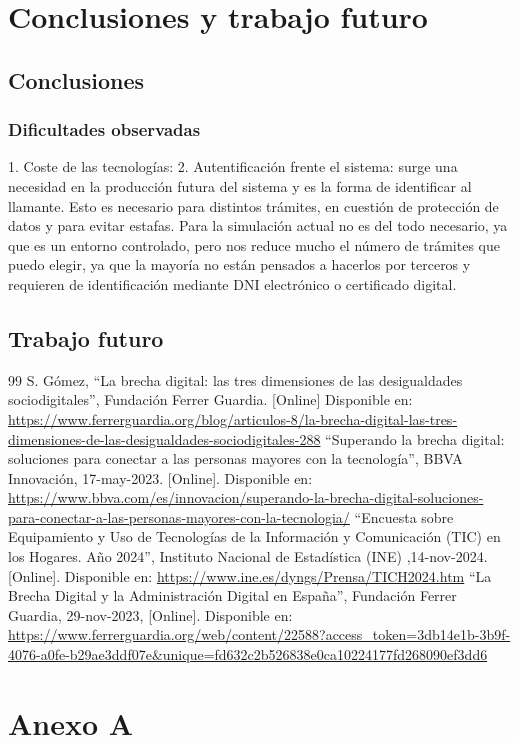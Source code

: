 \documentclass[12pt, a4paper, twoside]{report}
\begin{document}
\chapter{Conclusiones y trabajo futuro}

\section{Conclusiones}

    \subsection{Dificultades observadas}
        1. Coste de las tecnologías: 
        2. Autentificación frente el sistema: surge
        una necesidad en la producción futura del sistema y es la forma de
        identificar al llamante. Esto es necesario para distintos trámites, en
        cuestión de protección de datos y para evitar estafas. Para la simulación
        actual no es del todo necesario, ya que es un entorno controlado, pero nos
        reduce mucho el número de trámites que puedo elegir, ya que la mayoría no
        están pensados a hacerlos por terceros y requieren de identificación
        mediante DNI electrónico o certificado digital.

\section{Trabajo futuro}





\begin{thebibliography}{99}
     S. Gómez, ``La brecha digital: las tres dimensiones de las desigualdades sociodigitales'', Fundación Ferrer Guardia. [Online] Disponible en: \url{https://www.ferrerguardia.org/blog/articulos-8/la-brecha-digital-las-tres-dimensiones-de-las-desigualdades-sociodigitales-288}
     ``Superando la brecha digital: soluciones para conectar a las personas mayores con la tecnología'', BBVA Innovación, 17-may-2023. [Online]. Disponible en: \url{https://www.bbva.com/es/innovacion/superando-la-brecha-digital-soluciones-para-conectar-a-las-personas-mayores-con-la-tecnologia/}
     ``Encuesta sobre Equipamiento y Uso de Tecnologías de la Información y Comunicación (TIC) en los Hogares. Año 2024'', Instituto Nacional de Estadística (INE) ,14-nov-2024. [Online]. Disponible en: \url{https://www.ine.es/dyngs/Prensa/TICH2024.htm}
     ``La Brecha Digital y la Administración Digital en España'', Fundación Ferrer Guardia, 29-nov-2023, [Online]. Disponible en: \url{https://www.ferrerguardia.org/web/content/22588?access_token=3db14e1b-3b9f-4076-a0fe-b29ae3ddf07e&unique=fd632c2b526838e0ca10224177fd268090ef3dd6}

\end{thebibliography}

\appendix
\chapter{Anexo A}
\end{document}
